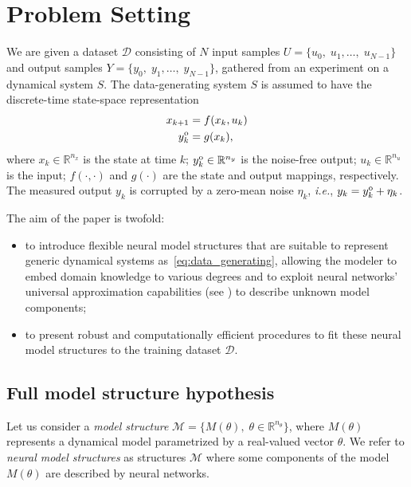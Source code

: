 \documentclass{article}
\newcommand{\So}{{S}}            %
\newcommand{\M}{{M}}             %
\newcommand{\MS}{\mathcal{M}}    %
\newcommand{\nin}{n_u}
\newcommand{\ny}{n_y}
\newcommand{\nx}{n_x}
\newcommand{\nsamp}{N}
\newcommand{\ntheta}{n_\theta}
\newcommand{\Yid}{Y}
\newcommand{\Uid}{U}
\newcommand{\Did}{{\mathcal{D}}}
\begin{document}
\section{Problem Setting}
\label{sec:settings}
We are given a dataset $\Did$ consisting of $\nsamp$ input samples $\Uid = \{u_{0},\;u_{1},\dots,\;u_{\nsamp-1}\}$ and output samples  $\Yid = \{y_{0},\;y_{1},\dots,\;y_{\nsamp-1}\}$, gathered from an experiment on a  dynamical system $\So$.  The data-generating system $\So$ is assumed to have the discrete-time  state-space representation
\begin{subequations}
\label{eq:data_generating}
\begin{align}
 x_{k+1} &= f(x_{k}, u_{k}) \\
 y^{\text o}_k     &= g(x_k),
\end{align}
\end{subequations}
where $x_k \in \mathbb{R}^{\nx}$ is the state at time $k$; $y^{\text o}_k  \in \mathbb{R}^{\ny}$ is the noise-free output; $u_k  \in \mathbb{R}^{\nin}$ is the input; $f(\cdot, \cdot)$ and $g(\cdot)$ are the state and output mappings, respectively.
The measured output $y_k$ is  corrupted by a zero-mean  noise $\eta_k$, \emph{i.e.}, $y_k =  y^{\text o}_k  + \eta_k$. 

The aim of the paper is twofold:
\begin{itemize}
	\item to introduce flexible neural model structures that are suitable to represent generic dynamical systems as~\eqref{eq:data_generating}, allowing the modeler to embed domain knowledge to various degrees and to exploit neural networks' universal approximation capabilities (see  \citep{hornik1989multilayer}) to describe unknown model components;
	\item to present  robust and computationally efficient procedures to fit these neural model structures to the training dataset  $\Did$.
\end{itemize}	
 

\subsection{Full model structure hypothesis}
Let us consider a  \textit{model structure} $\MS = \{\M(\theta),\; \theta \in \mathbb{R}^{\ntheta}\}$, where $M(\theta)$ represents a dynamical model parametrized by a real-valued vector $\theta$.  We refer to \textit{neural model structures} as structures $\MS$ where some components of the model $M(\theta)$ are described by neural networks.
\end{document}
